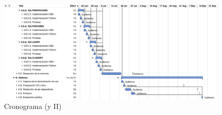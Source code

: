 \begin{landscape}
\begin{figure}[htbp]
\centering
\vspace*{1.2cm}
\includegraphics[width=24cm]{gantt2}
\caption{Cronograma (y II)}
\label{fig:gantt2}
\end{figure}
\end{landscape}
